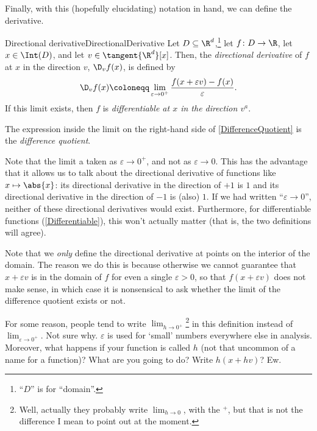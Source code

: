 Finally, with this (hopefully elucidating) notation in hand, we can define the derivative.
\begin{dfn}{Directional derivative}{DirectionalDerivative}
Let $D\subseteq \R ^d$,\footnote{``$D$'' is for ``domain''.} let $f\colon D\rightarrow \R$, let $x\in \Int (D)$, and let $v\in \tangent{\R ^d}[x]$.  Then, the \emph{directional derivative} of $f$ at $x$ in the direction $v$, $\D _vf(x)$, is defined by
\begin{equation}\label{DifferenceQuotient}
\D _vf(x)\coloneqq \lim _{\varepsilon \to 0^+}\frac{f(x+\varepsilon v)-f(x)}{\varepsilon}.
\end{equation}
If this limit exists, then $f$ is \emph{differentiable at $x$ in the direction $v^a$}.

The expression inside the limit on the right-hand side of \eqref{DifferenceQuotient} is the \emph{difference quotient}.
\begin{rmk}
Note that the limit a taken as $\varepsilon \to 0^+$, and not as $\varepsilon \to 0$.  This has the advantage that it allows us to talk about the directional derivative of functions like $x\mapsto \abs{x}$:  its directional derivative in the direction of $+1$ is $1$ and its directional derivative in the direction of $-1$ is (also) $1$.  If we had written ``$\varepsilon \to 0$'', neither of these directional derivatives would exist.  Furthermore, for differentiable functions (\cref{Differentiable}), this won't actually matter (that is, the two definitions will agree).
\end{rmk}
\begin{rmk}
Note that we \emph{only} define the directional derivative at points on the interior of the domain.  The reason we do this is because otherwise we cannot guarantee that $x+\varepsilon v$ is in the domain of $f$ for even a single $\varepsilon >0$, so that $f(x+\varepsilon v)$ does not make sense, in which case it is nonsensical to ask whether the limit of the difference quotient exists or not.
\end{rmk}
\begin{rmk}
For some reason, people tend to write $\lim _{h\to 0^+}$\footnote{Well, actually they probably write $\lim _{h\to 0}$, with the $^+$, but that is not the difference I mean to point out at the moment.} in this definition instead of $\lim _{\varepsilon \to 0^+}$.  Not sure why.  $\varepsilon$ is used for `small' numbers everywhere else in analysis.  Moreover, what happens if your function is called $h$ (not that uncommon of a name for a function)?  What are you going to do?  Write $h(x+hv)$?  Ew.
\end{rmk}
\end{dfn}
